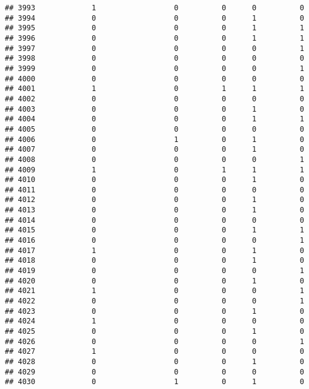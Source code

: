 \documentclass[
]{article}
\begin{document}
\begin{verbatim}
## 3993             1                  0          0      0          0
## 3994             0                  0          0      1          0
## 3995             0                  0          0      1          1
## 3996             0                  0          0      1          1
## 3997             0                  0          0      0          1
## 3998             0                  0          0      0          0
## 3999             0                  0          0      0          1
## 4000             0                  0          0      0          0
## 4001             1                  0          1      1          1
## 4002             0                  0          0      0          0
## 4003             0                  0          0      1          0
## 4004             0                  0          0      1          1
## 4005             0                  0          0      0          0
## 4006             0                  1          0      1          0
## 4007             0                  0          0      1          0
## 4008             0                  0          0      0          1
## 4009             1                  0          1      1          1
## 4010             0                  0          0      1          0
## 4011             0                  0          0      0          0
## 4012             0                  0          0      1          0
## 4013             0                  0          0      1          0
## 4014             0                  0          0      0          0
## 4015             0                  0          0      1          1
## 4016             0                  0          0      0          1
## 4017             1                  0          0      1          0
## 4018             0                  0          0      1          0
## 4019             0                  0          0      0          1
## 4020             0                  0          0      1          0
## 4021             1                  0          0      0          1
## 4022             0                  0          0      0          1
## 4023             0                  0          0      1          0
## 4024             1                  0          0      0          0
## 4025             0                  0          0      1          0
## 4026             0                  0          0      0          1
## 4027             1                  0          0      0          0
## 4028             0                  0          0      1          0
## 4029             0                  0          0      0          0
## 4030             0                  1          0      1          0

\end{verbatim}
\end{document}
